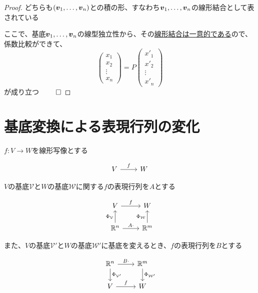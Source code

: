\documentclass[../../../topic_linear-algebra]{subfiles}
\begin{document}
\begin{proof}
  どちらも$(\vb*{v}_1, \ldots, \vb*{v}_n)$との積の形、すなわち$\vb*{v}_1, \ldots, \vb*{v}_n$の線形結合として表されている

  ここで、基底$\vb*{v}_1, \ldots, \vb*{v}_n$の線型独立性から、その\hyperref[thm:lin-indep-iff-unique-lincomb]{線形結合は一意的である}ので、係数比較ができて、
  \begin{equation*}
    \begin{pmatrix}
      x_1    \\
      x_2    \\
      \vdots \\
      x_n
    \end{pmatrix} = P \begin{pmatrix}
      x'_1   \\
      x'_2   \\
      \vdots \\
      x'_n
    \end{pmatrix}
  \end{equation*}
  が成り立つ $\qed$
\end{proof}

\sectionline
\section{基底変換による表現行列の変化}

$f\colon V \to W$を線形写像とする

\begin{equation*}
  \begin{tikzcd}
    V \arrow[r,"f"] & W
  \end{tikzcd}
\end{equation*}

$V$の基底$\mathcal{V}$と$W$の基底$\mathcal{W}$に関する$f$の表現行列を$A$とする

\begin{equation*}
  \begin{tikzcd}
    V \arrow[r,"f"] & W \\
    \mathbb{R}^n \arrow[u,"{\Phi_{\mathcal{V}}}"] \arrow[r,"A\cdot"] & \mathbb{R}^m \arrow[u,"{\Phi_{\mathcal{W}}}"]
  \end{tikzcd}
\end{equation*}

また、$V$の基底$\mathcal{V}'$と$W$の基底$\mathcal{W}'$に基底を変えるとき、$f$の表現行列を$B$とする

\begin{equation*}
  \begin{tikzcd}
    \mathbb{R}^n \arrow[d,"{\Phi_{\mathcal{V}'}}"] \arrow[r,"B\cdot"] & \mathbb{R}^m \arrow[d,"{\Phi_{\mathcal{W}'}}"] \\
    V \arrow[r,"f"] & W
  \end{tikzcd}
\end{equation*}
\end{document}
